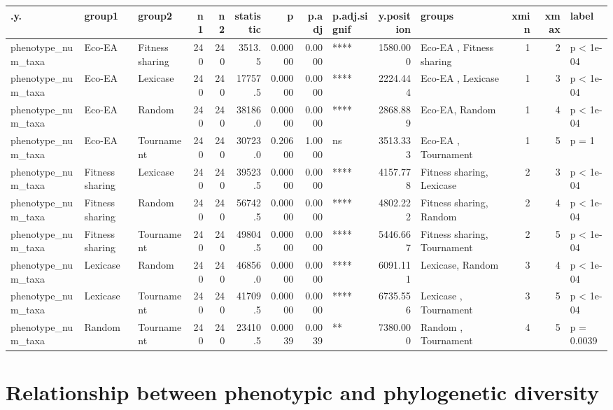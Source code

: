 \documentclass[]{book}
\begin{document}
\begin{table}
\centering
\begin{tabular}[t]{l|l|l|r|r|r|r|r|l|r|l|r|r|l}
\hline
.y. & group1 & group2 & n1 & n2 & statistic & p & p.adj & p.adj.signif & y.position & groups & xmin & xmax & label\\
\hline
phenotype\_num\_taxa & Eco-EA & Fitness sharing & 240 & 240 & 3513.5 & 0.00000 & 0.0000 & **** & 1580.000 & Eco-EA         , Fitness sharing & 1 & 2 & p < 1e-04\\
\hline
phenotype\_num\_taxa & Eco-EA & Lexicase & 240 & 240 & 17757.5 & 0.00000 & 0.0000 & **** & 2224.444 & Eco-EA  , Lexicase & 1 & 3 & p < 1e-04\\
\hline
phenotype\_num\_taxa & Eco-EA & Random & 240 & 240 & 38186.0 & 0.00000 & 0.0000 & **** & 2868.889 & Eco-EA, Random & 1 & 4 & p < 1e-04\\
\hline
phenotype\_num\_taxa & Eco-EA & Tournament & 240 & 240 & 30723.0 & 0.20600 & 1.0000 & ns & 3513.333 & Eco-EA    , Tournament & 1 & 5 & p = 1\\
\hline
phenotype\_num\_taxa & Fitness sharing & Lexicase & 240 & 240 & 39523.5 & 0.00000 & 0.0000 & **** & 4157.778 & Fitness sharing, Lexicase & 2 & 3 & p < 1e-04\\
\hline
phenotype\_num\_taxa & Fitness sharing & Random & 240 & 240 & 56742.5 & 0.00000 & 0.0000 & **** & 4802.222 & Fitness sharing, Random & 2 & 4 & p < 1e-04\\
\hline
phenotype\_num\_taxa & Fitness sharing & Tournament & 240 & 240 & 49804.5 & 0.00000 & 0.0000 & **** & 5446.667 & Fitness sharing, Tournament & 2 & 5 & p < 1e-04\\
\hline
phenotype\_num\_taxa & Lexicase & Random & 240 & 240 & 46856.0 & 0.00000 & 0.0000 & **** & 6091.111 & Lexicase, Random & 3 & 4 & p < 1e-04\\
\hline
phenotype\_num\_taxa & Lexicase & Tournament & 240 & 240 & 41709.5 & 0.00000 & 0.0000 & **** & 6735.556 & Lexicase  , Tournament & 3 & 5 & p < 1e-04\\
\hline
phenotype\_num\_taxa & Random & Tournament & 240 & 240 & 23410.5 & 0.00039 & 0.0039 & ** & 7380.000 & Random    , Tournament & 4 & 5 & p = 0.0039\\
\hline
\end{tabular}
\end{table}

\hypertarget{relationship-between-phenotypic-and-phylogenetic-diversity-1}{%
\section{Relationship between phenotypic and phylogenetic diversity}\label{relationship-between-phenotypic-and-phylogenetic-diversity-1}}
\end{document}
